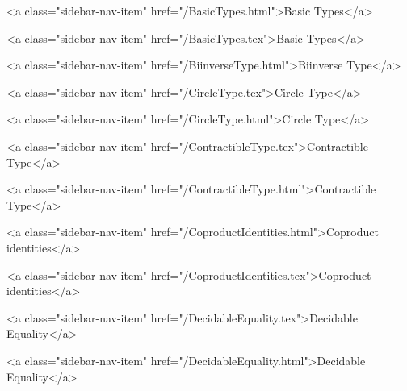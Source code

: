           <a class="sidebar-nav-item" href="/BasicTypes.html">Basic Types</a>
        
      
    
      
        
          <a class="sidebar-nav-item" href="/BasicTypes.tex">Basic Types</a>
        
      
    
      
        
          <a class="sidebar-nav-item" href="/BiinverseType.html">Biinverse Type</a>
        
      
    
      
        
          <a class="sidebar-nav-item" href="/CircleType.tex">Circle Type</a>
        
      
    
      
        
          <a class="sidebar-nav-item" href="/CircleType.html">Circle Type</a>
        
      
    
      
        
          <a class="sidebar-nav-item" href="/ContractibleType.tex">Contractible Type</a>
        
      
    
      
        
          <a class="sidebar-nav-item" href="/ContractibleType.html">Contractible Type</a>
        
      
    
      
        
          <a class="sidebar-nav-item" href="/CoproductIdentities.html">Coproduct identities</a>
        
      
    
      
        
          <a class="sidebar-nav-item" href="/CoproductIdentities.tex">Coproduct identities</a>
        
      
    
      
        
          <a class="sidebar-nav-item" href="/DecidableEquality.tex">Decidable Equality</a>
        
      
    
      
        
          <a class="sidebar-nav-item" href="/DecidableEquality.html">Decidable Equality</a>
        
      
    
